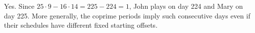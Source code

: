 Yes. Since $25\cdot9-16\cdot14=225-224=1$, John plays on day 224 and Mary on day 225. More generally, the coprime periods imply such consecutive days even if their schedules have different fixed starting offsets.
